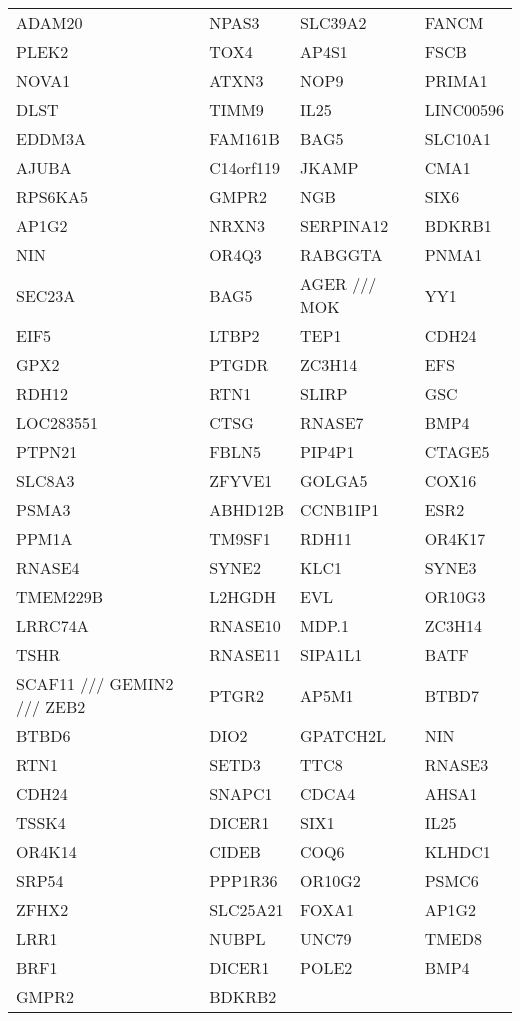 {\begin{longtable}{llll}
ADAM20&NPAS3&SLC39A2&FANCM\tabularnewline
PLEK2&TOX4&AP4S1&FSCB\tabularnewline
NOVA1&ATXN3&NOP9&PRIMA1\tabularnewline
DLST&TIMM9&IL25&LINC00596\tabularnewline
EDDM3A&FAM161B&BAG5&SLC10A1\tabularnewline
AJUBA&C14orf119&JKAMP&CMA1\tabularnewline
RPS6KA5&GMPR2&NGB&SIX6\tabularnewline
AP1G2&NRXN3&SERPINA12&BDKRB1\tabularnewline
NIN&OR4Q3&RABGGTA&PNMA1\tabularnewline
SEC23A&BAG5&AGER /// MOK&YY1\tabularnewline
EIF5&LTBP2&TEP1&CDH24\tabularnewline
GPX2&PTGDR&ZC3H14&EFS\tabularnewline
RDH12&RTN1&SLIRP&GSC\tabularnewline
LOC283551&CTSG&RNASE7&BMP4\tabularnewline
PTPN21&FBLN5&PIP4P1&CTAGE5\tabularnewline
SLC8A3&ZFYVE1&GOLGA5&COX16\tabularnewline
PSMA3&ABHD12B&CCNB1IP1&ESR2\tabularnewline
PPM1A&TM9SF1&RDH11&OR4K17\tabularnewline
RNASE4&SYNE2&KLC1&SYNE3\tabularnewline
TMEM229B&L2HGDH&EVL&OR10G3\tabularnewline
LRRC74A&RNASE10&MDP.1&ZC3H14\tabularnewline
TSHR&RNASE11&SIPA1L1&BATF\tabularnewline
SCAF11 /// GEMIN2 /// ZEB2&PTGR2&AP5M1&BTBD7\tabularnewline
BTBD6&DIO2&GPATCH2L&NIN\tabularnewline
RTN1&SETD3&TTC8&RNASE3\tabularnewline
CDH24&SNAPC1&CDCA4&AHSA1\tabularnewline
\newpage
TSSK4&DICER1&SIX1&IL25\tabularnewline
OR4K14&CIDEB&COQ6&KLHDC1\tabularnewline
SRP54&PPP1R36&OR10G2&PSMC6\tabularnewline
ZFHX2&SLC25A21&FOXA1&AP1G2\tabularnewline
LRR1&NUBPL&UNC79&TMED8\tabularnewline
BRF1&DICER1&POLE2&BMP4\tabularnewline
GMPR2&BDKRB2&&\tabularnewline
\bottomrule
\end{longtable}}
\addtocounter{table}{-1}
